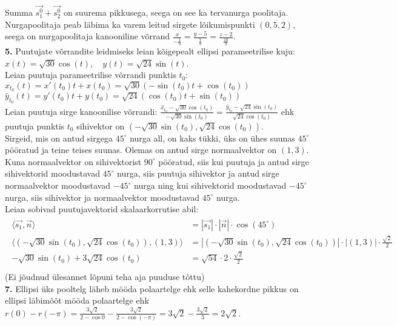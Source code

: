 \documentclass{article}
\begin{document}
Summa $\vec{s_1^0}+\vec{s_2^0}$ on suurema pikkusega, seega on see ka tervanurga poolitaja. Nurgapoolitaja peab läbima ka varem leitud sirgete lõikumispunkti $(0,5,2)$, seega on nurgapoolitaja kanooniline võrrand $\frac{x}{-\frac19}=\frac{y-5}{\frac79}=\frac{z-2}{\frac{10}9}$.
\pagebreak\\
\textbf{5.} Puutujate võrrandite leidmiseks leian kõigepealt ellipsi parameetrilise kuju:
$x(t)=\sqrt{30}\cos(t),\quad y(t)=\sqrt{24}\sin(t)$.\\
Leian puutuja parameetrilise võrrandi punktis $t_0$:\\
$\hat{x}_{t_0}(t)=x'(t_0)t+x(t_0)=\sqrt{30}(-\sin(t_0)t+\cos(t_0))$\\
$\hat{y}_{t_0}(t)=y'(t_0)t+y(t_0)=\sqrt{24}(\cos(t_0)t+\sin(t_0))$\\
Leian puutuja sirge kanoonilise võrrandi:
$\frac{\hat{x}_{t_0}-\sqrt{30}\cos(t_0)}{-\sqrt{30}\sin(t_0)}=\frac{\hat{y}_{t_0}-\sqrt{24}\sin(t_0)}{\sqrt{24}\cos(t_0)}$ ehk puutuja punktis $t_0$ sihivektor on $(-\sqrt{30}\sin(t_0),\sqrt{24}\cos(t_0))$.\\
Sirgeid, mis on antud sirgega $45^\circ$ nurga all, on kaks tükki, üks on ühes suunas $45^\circ$ pööratud ja teine teises suunas. Olemas on antud sirge normaalvektor on $(1,3)$. Kuna normaalvektor on sihivektorist $90^\circ$ pööratud, siis kui puutuja ja antud sirge sihivektorid moodustavad $45^\circ$ nurga, siis puutuja sihivektor ja antud sirge normaalvektor moodustavad $-45^\circ$ nurga ning kui sihivektorid moodustavad $-45^\circ$ nurga, siis sihivektor ja normaalvektor moodustavad $45^\circ$ nurga.\\
Leian sobivad puutujavektorid skalaarkorrutise abil:\\
\begin{gather*}
\begin{aligned}
\langle \vec{s_1},\vec{n}\rangle&=|\vec{s_1}|\cdot|\vec{n}|\cdot\cos(45^\circ)\\
\langle (-\sqrt{30}\sin(t_0),\sqrt{24}\cos(t_0)),(1,3)\rangle&=|(-\sqrt{30}\sin(t_0),\sqrt{24}\cos(t_0))|\cdot|(1,3)|\cdot\frac{\sqrt{2}}{2}\\
-\sqrt{30}\sin(t_0)+3\sqrt{24}\cos(t_0)&=\sqrt{54}\cdot2\cdot\frac{\sqrt{2}}{2}\\
\end{aligned}
\end{gather*}
(Ei jõudnud ülesannet lõpuni teha aja puuduse tõttu)
\pagebreak\\
\textbf{7. }Ellipsi üks pooltelg läheb mööda polaartelge ehk selle kahekordne pikkus on ellipsi läbimõõt mööda polaartelge ehk $r(0)-r(-\pi)=\frac{3\sqrt2}{2-\cos0}-\frac{3\sqrt2}{2-\cos(-\pi)}=3\sqrt2-\frac{3\sqrt2}{3}=2\sqrt{2}$.\\
\end{document}
